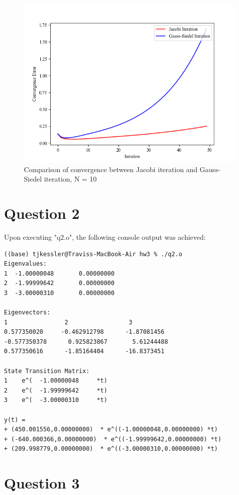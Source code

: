 \documentclass{report}
\begin{document}
	\begin{figure}[!ht]
		\centering
		\includegraphics[scale=0.9]{figures/convergence_curve_bad.png}
		\caption{Comparison of convergence between Jacobi iteration and Gauss-Siedel iteration, N = 10}
	\end{figure}

	\section*{Question 2}
	
	Upon executing "q2.o", the following console output was achieved:
	
	\begin{lstlisting}
((base) tjkessler@Traviss-MacBook-Air hw3 % ./q2.o
Eigenvalues:
1  -1.00000048       0.00000000    
2  -1.99999642       0.00000000    
3  -3.00000310       0.00000000    

Eigenvectors:
1                2                 3
0.577350020     -0.462912798      -1.87081456    
-0.577350378      0.925823867       5.61244488    
0.577350616      -1.85164404      -16.8373451    

State Transition Matrix:
1    e^(  -1.00000048     *t)
2    e^(  -1.99999642     *t)
3    e^(  -3.00000310     *t)

y(t) = 
+ (450.001556,0.00000000)  * e^((-1.00000048,0.00000000) *t)
+ (-640.000366,0.00000000)  * e^((-1.99999642,0.00000000) *t)
+ (209.998779,0.00000000)  * e^((-3.00000310,0.00000000) *t)
	\end{lstlisting}

	\section*{Question 3}
	
\end{document}
